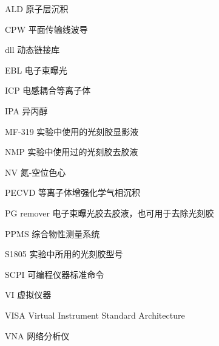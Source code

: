 

\begin{denotation}[3cm]
\item[ALD] 原子层沉积
\item[CPW] 平面传输线波导
\item[dll] 动态链接库
\item[EBL] 电子束曝光
\item[ICP] 电感耦合等离子体
\item[IPA] 异丙醇
\item[MF-319] 实验中使用的光刻胶显影液
\item[NMP] 实验中使用过的光刻胶去胶液
\item[NV] 氮-空位色心
\item[PECVD] 等离子体增强化学气相沉积
\item[PG remover] 电子束曝光胶去胶液，也可用于去除光刻胶
\item[PPMS] 综合物性测量系统
\item[S1805] 实验中所用的光刻胶型号
\item[SCPI] 可编程仪器标准命令
\item[VI] 虚拟仪器
\item[VISA] Virtual Instrument Standard Architecture
\item[VNA] 网络分析仪
\end{denotation}
